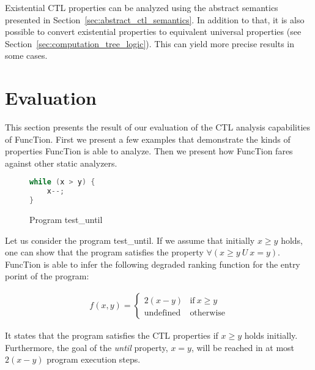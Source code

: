 \documentclass[11pt,a4paper,titlepage]{article}
\theoremstyle{definition}
\begin{document}
Existential CTL properties can be analyzed using the abstract semantics presented in Section~\ref{sec:abstract_ctl_semantics}. In addition to that, 
it is also possible to convert existential properties to equivalent universal properties (see Section~\ref{sec:computation_tree_logic}). 
This can yield more precise results in some cases.

\section{Evaluation}

This section presents the result of our evaluation of the CTL analysis capabilities of FuncTion. 
First we present a few examples that demonstrate the kinds of properties FuncTion is able to analyze. 
Then we present how FuncTion fares against other static analyzers.\\

\begin{figure}[h]
\centering
\begin{lstlisting}[language=C, numbers=right, numbersep=1pt]
while (x > y) {
    x--;
}
\end{lstlisting}
\caption{Program \textsf{test\_until}}
\end{figure}


Let us consider the program \textsf{test\_until}. If we assume that initially $x \geq y$ holds, one can show that the program satisfies 
the property $\forall(x \geq y \ U \ x = y)$. FuncTion is able to infer the following 
degraded ranking function for the entry porint of the program:

\begin{align*}
f(x, y) = \begin{cases}
    2(x-y) & \text{if} \ x \geq y \\
    \text{undefined}    & \text{otherwise}
\end{cases}
\end{align*}

It states that the program satisfies the CTL properties if $x \geq y$ holds initially. Furthermore, the goal of the \textit{until}
property, $x = y$, will be reached in at most $2(x-y)$ program execution steps.
\end{document}
